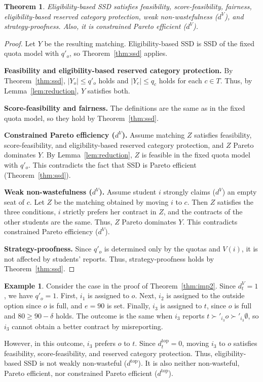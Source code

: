 \documentclass[a4paper,twoside]{article}
\newtheorem{theorem}{Theorem}
\theoremstyle{definition}
\newtheorem{example}{Example}
\newcommand{\dtop}{d^{\mathrm{top}}}
\newcommand{\dV}{d^{V}}
\begin{document}
\begin{theorem}
\label{thm:essd}
Eligibility-based SSD satisfies feasibility, score-feasibility, fairness,
eligibility-based reserved category protection, weak non-wastefulness ($\dV$), and
strategy-proofness. Also, it is constrained Pareto efficient ($\dV$).
\end{theorem}
\begin{proof}
Let $Y$ be the resulting matching.
Eligibility-based SSD is SSD of the fixed quota model with $q'_o$, so
Theorem~\ref{thm:ssd} applies.

\textbf{Feasibility and eligibility-based reserved category protection.}
By Theorem~\ref{thm:ssd}, $|Y_o|\le q'_o$ holds and $|Y_c|\le q_c$ holds for each
$c\in T$.
Thus, by Lemma~\ref{lem:reduction}, $Y$ satisfies both.

\textbf{Score-feasibility and fairness.}
The definitions are the same as in the fixed quota model, so they hold by
Theorem~\ref{thm:ssd}.

\textbf{Constrained Pareto efficiency ($\dV$).}
Assume matching $Z$ satisfies feasibility, score-feasibility, and eligibility-based
reserved category protection, and $Z$ Pareto dominates $Y$.
By Lemma~\ref{lem:reduction}, $Z$ is feasible in the fixed quota model with $q'_o$.
This contradicts the fact that SSD is Pareto efficient (Theorem~\ref{thm:ssd}).

\textbf{Weak non-wastefulness ($\dV$).}
Assume student $i$ strongly claims ($\dV$) an empty seat of $c$.
Let $Z$ be the matching obtained by moving $i$ to $c$.
Then $Z$ satisfies the three conditions, $i$ strictly prefers her contract in $Z$, and
the contracts of the other students are the same.
Thus, $Z$ Pareto dominates $Y$. This contradicts constrained Pareto efficiency ($\dV$).

\textbf{Strategy-proofness.}
Since $q'_o$ is determined only by the quotas and $V(i)$, it is not affected by
students' reports.
Thus, strategy-proofness holds by Theorem~\ref{thm:ssd}.
\end{proof}

\begin{example}
\label{ex:essd}
Consider the case in the proof of Theorem~\ref{thm:imp2}.
Since $\dV_t=1$, we have $q'_o=1$.
First, $i_1$ is assigned to $o$.
Next, $i_2$ is assigned to the outside option since $o$ is full, and $e=90$ is set.
Finally, $i_3$ is assigned to $t$, since $o$ is full and $80\ge 90-\delta$ holds.
The outcome is the same when $i_3$ reports $t\succ'_{i_3}o\succ'_{i_3}\emptyset$, so
$i_3$ cannot obtain a better contract by misreporting.

However, in this outcome, $i_3$ prefers $o$ to $t$.
Since $\dtop_t=0$, moving $i_3$ to $o$ satisfies feasibility, score-feasibility, and
reserved category protection.
Thus, eligibility-based SSD is not weakly non-wasteful ($\dtop$).
It is also neither non-wasteful, Pareto efficient, nor constrained Pareto efficient
($\dtop$).
\end{example}
\end{document}
